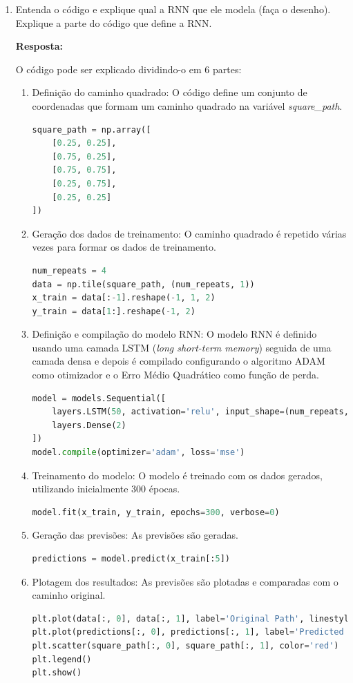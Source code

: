 \documentclass[12 pt]{article}
\begin{document}
\begin{enumerate}
    \item Entenda o código e explique qual a RNN que ele modela (faça o desenho). Explique a parte do código que define a RNN.
    
    \textbf{Resposta:} \par

    O código pode ser explicado dividindo-o em 6 partes:
    \begin{enumerate}
        \item Definição do caminho quadrado: O código define um conjunto de coordenadas que formam um caminho quadrado na variável \textit{square\_path}.
        \begin{lstlisting}[language=Python]
square_path = np.array([
    [0.25, 0.25],
    [0.75, 0.25],
    [0.75, 0.75],
    [0.25, 0.75],
    [0.25, 0.25]
])
        \end{lstlisting}
        \item Geração dos dados de treinamento: O caminho quadrado é repetido várias vezes para formar os dados de treinamento.
        \begin{lstlisting}[language=Python]
num_repeats = 4
data = np.tile(square_path, (num_repeats, 1))
x_train = data[:-1].reshape(-1, 1, 2)
y_train = data[1:].reshape(-1, 2)
        \end{lstlisting}
        \item Definição e compilação do modelo RNN: O modelo RNN é definido usando uma camada LSTM (\textit{long short-term memory}) seguida de uma camada densa e depois é compilado configurando o algoritmo ADAM como otimizador e o Erro Médio Quadrático como função de perda.
        \begin{lstlisting}[language=Python]
model = models.Sequential([
    layers.LSTM(50, activation='relu', input_shape=(num_repeats, 2)),
    layers.Dense(2)
])
model.compile(optimizer='adam', loss='mse')            
        \end{lstlisting}
        \item Treinamento do modelo: O modelo é treinado com os dados gerados, utilizando inicialmente 300 épocas.
        \begin{lstlisting}[language=Python]
model.fit(x_train, y_train, epochs=300, verbose=0)
        \end{lstlisting}
        \item Geração das previsões: As previsões são geradas.
        \begin{lstlisting}[language=Python]
predictions = model.predict(x_train[:5])
        \end{lstlisting}
        \item  Plotagem dos resultados: As previsões são plotadas e comparadas com o caminho original.
        \begin{lstlisting}[language=Python]
plt.plot(data[:, 0], data[:, 1], label='Original Path', linestyle='dashed', color='gray')
plt.plot(predictions[:, 0], predictions[:, 1], label='Predicted Path', color='blue')
plt.scatter(square_path[:, 0], square_path[:, 1], color='red')
plt.legend()
plt.show()
        \end{lstlisting}
    \end{enumerate}


\end{enumerate}
\end{document}
